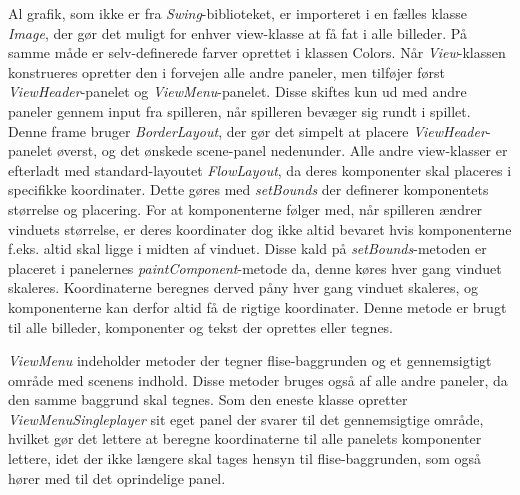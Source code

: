 \documentclass{report}
\begin{document}
Al grafik, som ikke er fra \textit{Swing}-biblioteket, er importeret i en fælles klasse \textit{Image}, der gør det muligt for enhver view-klasse at få fat i alle billeder. På samme måde er selv-definerede farver oprettet i klassen Colors.
Når \textit{View}-klassen konstrueres opretter den i forvejen alle andre paneler, men tilføjer først \textit{ViewHeader}-panelet og \textit{ViewMenu}-panelet. Disse skiftes kun ud med andre paneler gennem input fra spilleren, når spilleren bevæger sig rundt i spillet. Denne frame bruger \textit{BorderLayout}, der gør det simpelt at placere \textit{ViewHeader}-panelet øverst, og det ønskede scene-panel nedenunder. Alle andre view-klasser er efterladt med standard-layoutet \textit{FlowLayout}, da deres komponenter skal placeres i specifikke koordinater. Dette gøres med \textit{setBounds} der definerer komponentets størrelse og placering. For at komponenterne følger med, når spilleren ændrer vinduets størrelse, er deres koordinater dog ikke altid bevaret hvis komponenterne f.eks. altid skal ligge i midten af vinduet. Disse kald på \textit{setBounds}-metoden er placeret i panelernes \textit{paintComponent}-metode da, denne køres hver gang vinduet skaleres. Koordinaterne beregnes derved påny hver gang vinduet skaleres, og komponenterne kan derfor altid få de rigtige koordinater. Denne metode er brugt til alle billeder, komponenter og tekst der oprettes eller tegnes.

\textit{ViewMenu} indeholder metoder der tegner flise-baggrunden og et gennemsigtigt område med scenens indhold. Disse metoder bruges også af alle andre paneler, da den samme baggrund skal tegnes. Som den eneste klasse opretter \textit{ViewMenuSingleplayer} sit eget panel der svarer til det gennemsigtige område, hvilket gør det lettere at beregne koordinaterne til alle panelets komponenter lettere, idet der ikke længere skal tages hensyn til flise-baggrunden, som også hører med til det oprindelige panel.
\end{document}
